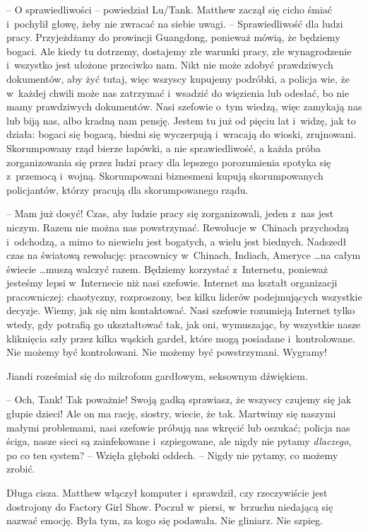 \documentclass[oneside,polish,11pt,rmheadings]{mwbk}
\begin{document}
-- O sprawiedliwości -- powiedział Lu/Tank. Matthew zaczął się cicho śmiać i~pochylił głowę, żeby nie zwracać na siebie uwagi. -- Sprawiedliwość dla ludzi pracy. Przyjeżdżamy do prowincji Guangdong, ponieważ mówią, że będziemy bogaci. Ale kiedy tu dotrzemy, dostajemy złe warunki pracy, złe wynagrodzenie i~wszystko jest ułożone przeciwko nam. Nikt nie może zdobyć prawdziwych dokumentów, aby żyć tutaj, więc wszyscy kupujemy podróbki, a policja wie, że w~każdej chwili może nas zatrzymać i~wsadzić do więzienia lub odesłać, bo nie mamy prawdziwych dokumentów. Nasi szefowie o~tym wiedzą, więc zamykają nas lub biją nas, albo kradną nam pensję. Jestem tu już od pięciu lat i~widzę, jak to działa: bogaci się bogacą, biedni się wyczerpują i~wracają do wioski, zrujnowani. Skorumpowany rząd bierze łapówki, a nie sprawiedliwość, a każda próba zorganizowania się przez ludzi pracy dla lepszego porozumienia spotyka się z~przemocą i~wojną. Skorumpowani biznesmeni kupują skorumpowanych policjantów, którzy pracują dla skorumpowanego rządu.

-- Mam już dosyć! Czas, aby ludzie pracy się zorganizowali, jeden z~nas jest niczym. Razem nie można nas powstrzymać. Rewolucje w~Chinach przychodzą i~odchodzą, a mimo to niewielu jest bogatych, a wielu jest biednych. Nadszedł czas na światową rewolucję: pracownicy w~Chinach, Indiach, Ameryce  \ldots  na całym świecie  \ldots  muszą walczyć razem. Będziemy korzystać z~Internetu, ponieważ jesteśmy lepsi w~Internecie niż nasi szefowie. Internet ma kształt organizacji pracowniczej: chaotyczny, rozproszony, bez kilku liderów podejmujących wszystkie decyzje. Wiemy, jak się nim kontaktować. Nasi szefowie rozumieją Internet tylko wtedy, gdy potrafią go ukształtować tak, jak oni, wymuszając, by wszystkie nasze kliknięcia szły przez kilka wąskich gardeł, które mogą posiadane i~kontrolowane. Nie możemy być kontrolowani. Nie możemy być powstrzymani. Wygramy! 

Jiandi roześmiał się do mikrofonu gardłowym, seksownym dźwiękiem. 

-- Och, Tank! Tak poważnie! Swoją gadką sprawiasz, że wszyscy czujemy się jak głupie dzieci! Ale on ma rację, siostry, wiecie, że tak. Martwimy się naszymi małymi problemami, nasi szefowie próbują nas wkręcić lub oszukać; policja nas ściga, nasze sieci są zainfekowane i~szpiegowane, ale nigdy nie pytamy \textit{dlaczego}, po co ten system? -- Wzięła głęboki oddech. -- Nigdy nie pytamy, co możemy zrobić.

Długa cisza. Matthew włączył komputer i~sprawdził, czy rzeczywiście jest dostrojony do Factory Girl Show. Poczuł w~piersi, w~brzuchu niedającą się nazwać emocję. Była tym, za kogo się podawała. Nie gliniarz. Nie szpieg.
\end{document}
